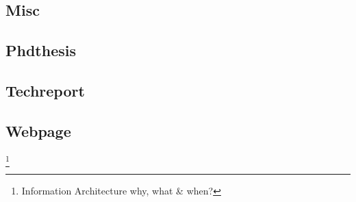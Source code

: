 \cite{macedo2005}

\subsection{Misc}

\cite{fultz2011}
\cite{limamarques2010}

\subsection{Phdthesis}

\cite{guizzardi2005}

\subsection{Techreport}

\cite{iaea2010}

\subsection{Webpage}

\cite{dillon2000}\footnote{Information Architecture why, what \& when?}
